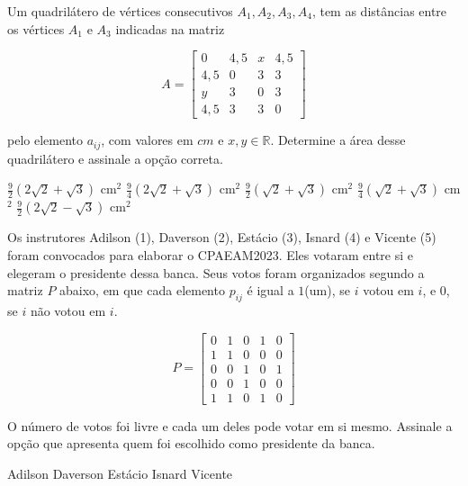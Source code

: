 \begin{question}%
Um quadrilátero de vértices consecutivos \(A_1,A_2,A_3,A_4\), tem as distâncias entre os vértices \(A_1\) e \(A_3\) indicadas na matriz

\[
A = \begin{bmatrix}
0   & 4,5 & x & 4,5\\
4,5 & 0   & 3 & 3  \\
y   & 3   & 0 & 3  \\
4,5 & 3   & 3 & 0
\end{bmatrix}
\]

pelo elemento \(a_{ij}\), com valores em \(cm\) e \(x,y \in \mathbb{R}\). Determine a área desse quadrilátero e assinale a opção correta.
    \begin{tasks}
        \task \(\frac{9}{2} (2\sqrt{2} + \sqrt{3})\) cm\(^2\)
        \task \(\frac{9}{4} (2\sqrt{2} + \sqrt{3})\) cm\(^2\)
        \task \(\frac{9}{2} (\sqrt{2} + \sqrt{3})\) cm\(^2\)
        \task \(\frac{9}{4} (\sqrt{2} + \sqrt{3})\) cm\(^2\)
        \task \(\frac{9}{2} (2\sqrt{2} - \sqrt{3})\) cm\(^2\)
    \end{tasks}
\end{question}

\begin{question}%
Os instrutores Adilson (1), Daverson (2), Estácio (3), Isnard (4) e Vicente (5) foram convocados para elaborar o CPAEAM2023. Eles votaram entre si e elegeram o presidente dessa banca. Seus votos foram organizados segundo a matriz \(P\) abaixo, em que cada elemento \(p_{ij}\) é igual a \(1\)(um), se \(i\) votou em \(i\), e \(0\), se \(i\) não votou em \(i\).

\[
P = \begin{bmatrix}
0 & 1 & 0 & 1 & 0\\
1 & 1 & 0 & 0 & 0\\
0 & 0 & 1 & 0 & 1\\
0 & 0 & 1 & 0 & 0\\
1 & 1 & 0 & 1 & 0
\end{bmatrix}
\]

O número de votos foi livre e cada um deles pode votar em si mesmo. Assinale a opção que apresenta quem foi escolhido como presidente da banca.
    \begin{tasks}
        \task Adilson
        \task Daverson
        \task Estácio
        \task Isnard
        \task Vicente
    \end{tasks}
\end{question}


